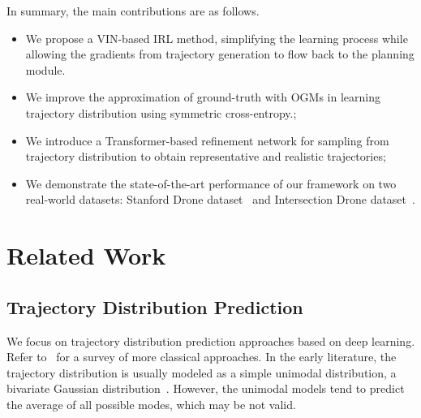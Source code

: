 \documentclass[10pt,twocolumn,letterpaper]{article}
\begin{document}
In summary, the main contributions are as follows. 
\begin{itemize}
\itemsep=-5pt
\item We propose a VIN-based IRL method, simplifying the learning process while allowing the gradients from trajectory generation to flow back to the planning module. 
    \item We improve the approximation of ground-truth with OGMs in
    learning trajectory distribution using symmetric cross-entropy.;
\item We introduce a Transformer-based refinement network for sampling from trajectory distribution to obtain representative and realistic trajectories; 
    \item We demonstrate the state-of-the-art performance of our framework on two real-world datasets: Stanford Drone dataset~\cite{robicquet2016learning} and Intersection Drone dataset~\cite{inDdataset}.
\end{itemize}

\section{Related Work}
\label{sec:related}

\subsection{Trajectory Distribution Prediction}

We focus on trajectory distribution prediction approaches based on deep learning. Refer to~\cite{rudenko2020human} for a survey of more classical approaches. In the early literature, the trajectory distribution is usually modeled as a simple unimodal distribution, \eg a bivariate Gaussian distribution~\cite{alahi2016social,luo2018fast,zhang2019sr}. However, the unimodal models tend to predict the average of all possible modes, which may be not valid.
\end{document}
